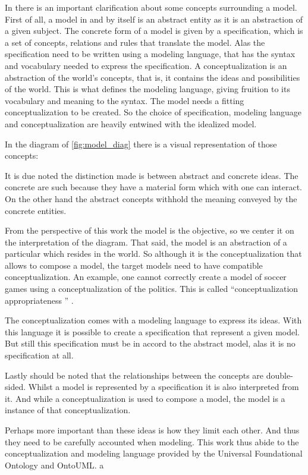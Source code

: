 In \cite{guizzardi_ontological_2005} there is an important clarification about some concepts surrounding a model. First of all, a model in and by itself is an abstract entity as it is an abstraction of a given subject. The concrete form of a model is given by a specification, which is a set of concepts, relations and rules that translate the model. Alas the specification need to be written using a modeling language, that has the syntax and vocabulary needed to express the specification. A conceptualization is an abstraction of the world's concepts, that is, it contains the ideas and possibilities of the world. This is what defines the modeling language, giving fruition to its vocabulary and meaning to the syntax. The model needs a fitting conceptualization to be created. So the choice of specification, modeling language and conceptualization are heavily entwined with the idealized model.

In the diagram of \autoref{fig:model_diag} there is a visual representation of those concepts:



It is due noted the distinction made is between abstract and concrete ideas. The concrete are such because they have a material form which with one can interact. On the other hand the abstract concepts withhold the meaning conveyed by the concrete entities.

From the perspective of this work the model is the objective, so we center it on the interpretation of the diagram. That said, the model is an abstraction of a particular which resides in the world. So although it is the conceptualization that allows to compose a model, the target models need to have compatible conceptualization. An example, one cannot correctly create a model of soccer games using a conceptualization of the politics. This is called ``conceptualization appropriateness '' \cite{guizzardi_ontological_2005}.

The conceptualization comes with a modeling language to express its ideas. With this language it is possible to create a specification that represent a given model. But still this specification must be in accord to the abstract model, alas it is no specification at all. 

Lastly should be noted that the relationships between the concepts are double-sided. Whilst a model is represented by a specification it is also interpreted from it. And while a conceptualization is used to compose a model, the model is a instance of that conceptualization.

Perhaps more important than these ideas is how they limit each other. And thus they need to be carefully accounted when modeling. This work thus abide to the conceptualization and modeling language provided by the Universal Foundational Ontology and OntoUML. a